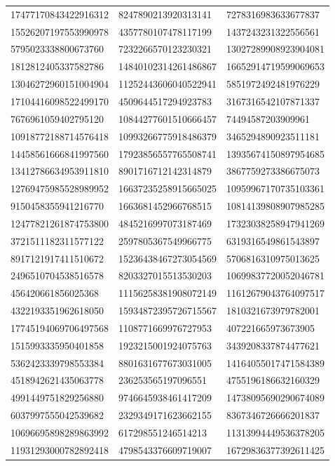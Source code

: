 \begin{longtable}{*{3}{l}}
17477170843422916312&8247890213920313141&7278316983633677837\\
15526207197553990978&4357780107478117199&1437243231322556561\\
5795023338800673760&7232266570123230321&13027289908923904081\\
1812812405337582786&14840102314261486867&16652914719599069653\\
13046272960151004904&11252443606040522941&5851972492481976229\\
17104416098522499170&4509644517294923783&3167316542107871337\\
7676961059402795120&10844277601510666457&74494587203909961\\
10918772188714576418&10993266775918486379&3465294890923511181\\
14458561666841997560&17923856557765508741&13935674150897954685\\
13412786634953911810&8901716712142314879&3867759273386675073\\
12769475985528989952&16637235258915665025&10959967170735103361\\
9150458355941216770&1663681452966768515&10814139808907985285\\
12477821261874753800&4845216997073187469&17323038258947941269\\
3721511182311577122&2597805367549966775&6319316549861543897\\
8917121917411510672&15236438467273054569&5706816310975013625\\
2496510704538516578&8203327015513530203&10699837720052046781\\
456420661856025368&11156258381908072149&11612679043764097517\\
4322193351962618050&15934872395726715567&1810321673979782001\\
17745194069706497568&1108771669976727953&407221665973673905\\
1515993335950401858&1923215001924075763&3439208337874477621\\
5362423339798553384&8801631677673031005&14164055017471584389\\
4518942621435063778&236253565197096551&4755196186632160329\\
4991449751829256880&9746645938461417209&14738095690290674089\\
6037997555042539682&2329349171623662155&8367346726666201837\\
10696695898289863992&617298551246514213&11313994449536378205\\
11931293000782892418&4798543376609719007&16729836377392611425\\

\end{longtable}
